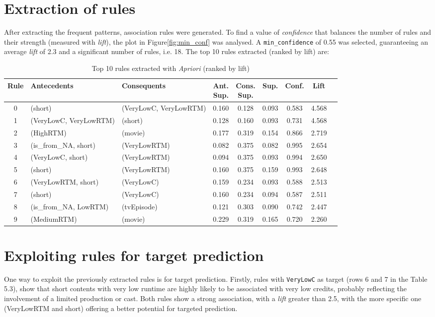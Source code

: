 \section{Extraction of rules}\label{sec:rules}
After extracting the frequent patterns, association rules were generated.
To find a value of \textit{confidence} that balances the number of rules and their strength (measured with \textit{lift}), 
the plot in Figure\ref{fig:min_conf} was analysed. A \texttt{min\_confidence} of 0.55 was selected, guaranteeing an average \textit{lift} of 2.3 and 
a significant number of rules, i.e. 18. The top 10 rules extracted (ranked by lift) are:
\begin{table}[h]
\centering
\begin{tabular}{cllcccccc}
\toprule
\textbf{Rule} & \textbf{Antecedents} & \textbf{Consequents} & \shortstack{\textbf{Ant.}\\\textbf{Sup.}} & \shortstack{\textbf{Cons.}\\\textbf{Sup.}} & \textbf{Sup.} & \textbf{Conf.} & \textbf{Lift} \\
\midrule
0 & (short) & (VeryLowC, VeryLowRTM) & 0.160 & 0.128 & 0.093 & 0.583 & 4.568 \\
1 & (VeryLowC, VeryLowRTM) & (short) & 0.128 & 0.160 & 0.093 & 0.731 & 4.568 \\
2 & (HighRTM) & (movie) & 0.177 & 0.319 & 0.154 & 0.866 & 2.719 \\
3 & (is\_from\_NA, short) & (VeryLowRTM) & 0.082 & 0.375 & 0.082 & 0.995 & 2.654 \\
4 & (VeryLowC, short) & (VeryLowRTM) & 0.094 & 0.375 & 0.093 & 0.994 & 2.650 \\
5 & (short) & (VeryLowRTM) & 0.160 & 0.375 & 0.159 & 0.993 & 2.648 \\
6 & (VeryLowRTM, short) & (VeryLowC) & 0.159 & 0.234 & 0.093 & 0.588 & 2.513 \\
7 & (short) & (VeryLowC) & 0.160 & 0.234 & 0.094 & 0.587 & 2.511 \\
8 & (is\_from\_NA, LowRTM) & (tvEpisode) & 0.121 & 0.303 & 0.090 & 0.742 & 2.447 \\
9 & (MediumRTM) & (movie) & 0.229 & 0.319 & 0.165 & 0.720 & 2.260 \\
\bottomrule
\end{tabular}
\caption{Top 10 rules extracted with \textit{Apriori} (ranked by lift)}
\end{table}
\section{Exploiting rules for target prediction}\label{sec:prediction_rules}
One way to exploit the previously extracted rules is for target prediction. 
Firstly, rules with \texttt{VeryLowC} as target (rows 6 and 7 in the Table 5.3), show that short contents with very low runtime are highly likely to be associated with very low credits, 
probably reflecting the involvement of a limited production or cast. 
Both rules show a strong association, with a \textit{lift} greater than 2.5, with the more specific one (VeryLowRTM and short) offering a better potential for targeted prediction. \\

